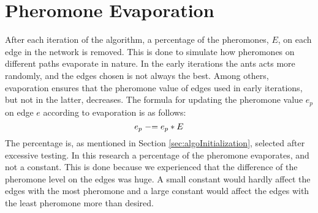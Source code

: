 \section{Pheromone Evaporation}

After each iteration of the algorithm, a percentage of the pheromones, $E$, on each edge in the network is removed. This is done to simulate how pheromones on different paths evaporate in nature. In the early iterations the ants acts more randomly, and the edges chosen is not always the best. Among others, evaporation ensures that the pheromone value of edges used in early iterations, but not in the latter, decreases. The formula for updating the pheromone value $e_p$ on edge $e$ according to evaporation is as follows: 
\newline
$$e_p \mathrel{-}= e_p*E$$
\newline
The percentage is, as mentioned in Section \vref{sec:algoInitialization}, selected after excessive testing. In this research a percentage of the pheromone evaporates, and not a constant. This is done because we experienced that the difference of the pheromone level on the edges was huge. A small constant would hardly affect the edges with the most pheromone and a large constant would affect the edges with the least pheromone more than desired. 